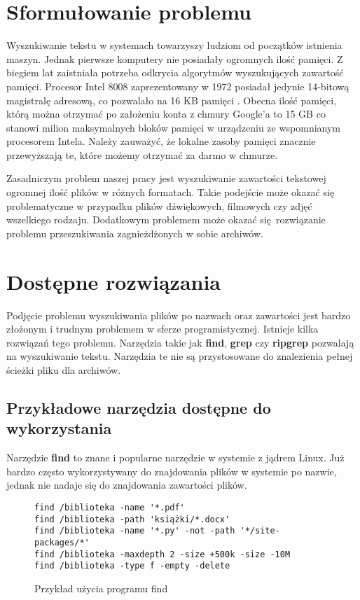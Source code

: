 \section{Sformułowanie problemu}
Wyszukiwanie tekstu w systemach towarzyszy ludziom od początków istnienia maszyn.
Jednak pierwsze komputery nie posiadały ogromnych ilość pamięci. Z biegiem lat
zaistniała potrzeba odkrycia algorytmów wyszukujących zawartość pamięci. 
Procesor Intel 8008 zaprezentowany w 1972 posiadał jedynie 14-bitową magistralę
adresową, co pozwalało na 16 KB pamięci \cite{bib:internet:Intel8008}. 
Obecna ilość pamięci, którą można otrzymać po założeniu konta z chmury Google'a to 15 GB
\cite{bib:internet:GoogleCloud} co stanowi milion maksymalnych bloków pamięci w 
urządzeniu ze wspomnianym procesorem Intela. Należy zauważyć, że lokalne zasoby
 pamięci znacznie przewyższają te, które możemy otrzymać za darmo w chmurze.

Zasadniczym problem naszej pracy jest wyszukiwanie zawartości tekstowej
ogromnej ilość plików w różnych formatach. Takie podejście może okazać się 
problematyczne \newline w przypadku plików dźwiękowych, filmowych czy zdjęć
wszelkiego rodzaju. Dodatkowym problemem może okazać się rozwiązanie problemu
przeszukiwania zagnieżdżonych w sobie archiwów.

\section{Dostępne rozwiązania} %

Podjęcie problemu wyszukiwania plików po nazwach oraz zawartości jest bardzo
złożonym i trudnym problemem w sferze programistycznej. Istnieje kilka rozwiązań
tego problemu. Narzędzia takie jak \textbf{find}, \textbf{grep} czy \textbf{ripgrep} 
\cite{bib:internet:ripgrep} pozwalają na wyszukiwanie tekstu. Narzędzia te nie 
są przystosowane do znalezienia pełnej ścieżki pliku dla archiwów.

\subsection{Przykładowe narzędzia dostępne do wykorzystania}

Narzędzie \textbf{find} to znane i popularne narzędzie w systemie z jądrem Linux.
Już bardzo często wykorzystywany do znajdowania plików w systemie po nazwie, 
jednak nie nadaje się do znajdowania zawartości plików.

\begin{figure}[htbp]
  \centering
\begin{tcolorbox}[
    colback=white,
    colframe=black,
    boxrule=0.5pt,
    arc=0pt
]
  \begin{verbatim}
find /biblioteka -name '*.pdf'
find /biblioteka -path 'książki/*.docx' 
find /biblioteka -name '*.py' -not -path '*/site-packages/*'  
find /biblioteka -maxdepth 2 -size +500k -size -10M           
find /biblioteka -type f -empty -delete 
  \end{verbatim}
\end{tcolorbox}
\caption{Przykład użycia programu find}
\label{fig:cmd:findExamples}
\end{figure}


